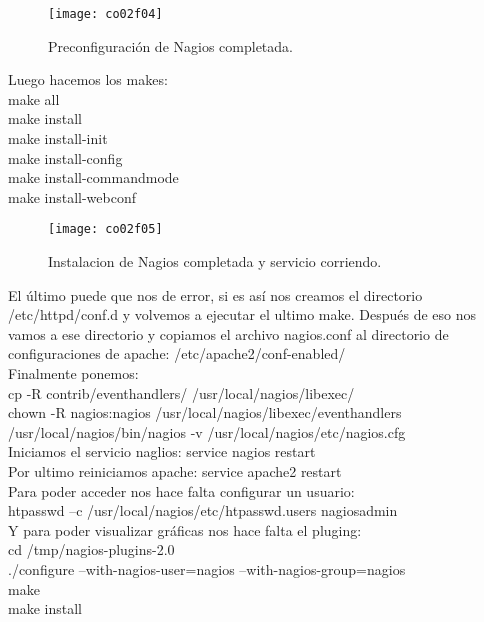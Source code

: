 \begin{figure}[H]
	\centering
	\texttt{[image: co02f04]}
	\caption{Preconfiguración de Nagios completada.}
	\label{fig:co02f04}
\end{figure}

Luego hacemos los makes:\\
make all\\
make install\\
make install-init\\
make install-config\\
make install-commandmode\\
make install-webconf\\

\begin{figure}[H]
	\centering
	\texttt{[image: co02f05]}
	\caption{Instalacion de Nagios completada y servicio corriendo.}
	\label{fig:co02f05}
\end{figure}

El último puede que nos de error, si es así nos creamos el directorio /etc/httpd/conf.d y volvemos a ejecutar el ultimo make. Después de eso nos vamos a ese directorio y copiamos el archivo nagios.conf al directorio de configuraciones de apache: /etc/apache2/conf-enabled/ \\

Finalmente ponemos:\\
cp -R contrib/eventhandlers/ /usr/local/nagios/libexec/ \\
chown -R nagios:nagios /usr/local/nagios/libexec/eventhandlers \\
/usr/local/nagios/bin/nagios -v /usr/local/nagios/etc/nagios.cfg \\

Iniciamos el servicio naglios: service nagios restart \\

Por ultimo reiniciamos apache: service apache2 restart \\


Para poder acceder nos hace falta configurar un usuario:\\

htpasswd –c /usr/local/nagios/etc/htpasswd.users nagiosadmin \\


Y para poder visualizar gráficas nos hace falta el pluging:\\

cd /tmp/nagios-plugins-2.0 \\
./configure --with-nagios-user=nagios --with-nagios-group=nagios \\
make \\
make install \\

